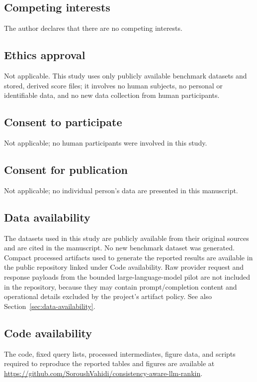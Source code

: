 \documentclass[pdflatex,sn-basic,Numbered]{sn-jnl}
\begin{document}
\subsection*{Competing interests}
The author declares that there are no competing interests.

\subsection*{Ethics approval}
Not applicable. This study uses only publicly available benchmark
datasets and stored, derived score files; it involves no human subjects,
no personal or identifiable data, and no new data collection from human
participants.

\subsection*{Consent to participate}
Not applicable; no human participants were involved in this study.

\subsection*{Consent for publication}
Not applicable; no individual person's data are presented in this
manuscript.

\subsection*{Data availability}
The datasets used in this study are publicly available from their original
sources and are cited in the manuscript. No new benchmark dataset was
generated. Compact processed artifacts used to generate the reported
results are available in the public repository linked under Code
availability. Raw provider request and response payloads from the bounded
large-language-model pilot are not included in the repository, because
they may contain prompt/completion content and operational details
excluded by the project's artifact policy. See also
Section~\ref{sec:data-availability}.

\subsection*{Code availability}
The code, fixed query lists, processed intermediates, figure data, and
scripts required to reproduce the reported tables and figures are
available at
\url{https://github.com/SoroushVahidi/consistency-aware-llm-rankin}.
\end{document}
